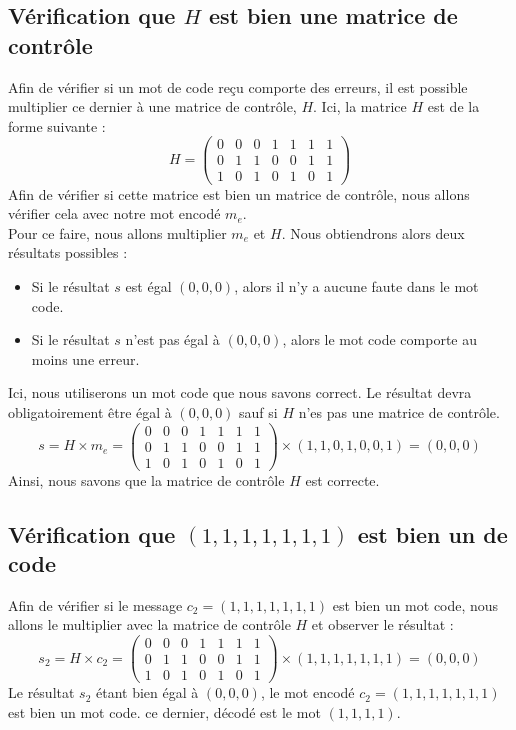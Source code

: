 \subsection{Vérification que $H$ est bien une matrice de contrôle}
Afin de vérifier si un mot de code reçu comporte des erreurs, il est possible multiplier ce dernier à une matrice de contrôle, $H$. Ici, la matrice $H$ est de la forme suivante :
\begin{equation}
 H=
 \begin{pmatrix}
  0 & 0 & 0 & 1 & 1 & 1 & 1 \\
  0 & 1 & 1 & 0 & 0 & 1 & 1 \\
  1 & 0 & 1 & 0 & 1 & 0 & 1
 \end{pmatrix}
\end{equation}
Afin de vérifier si cette matrice est bien un matrice de contrôle, nous allons vérifier cela avec notre mot encodé $m_e$.\\
Pour ce faire, nous allons multiplier $m_e$ et $H$. Nous obtiendrons alors deux résultats possibles :
\begin{itemize}
 \item Si le résultat $s$ est égal $(0,0,0)$, alors il n'y a aucune faute dans le mot code.
 \item Si le résultat $s$ n'est pas égal à $(0,0,0)$, alors le mot code comporte au moins une erreur. 
\end{itemize}
Ici, nous utiliserons un mot code que nous savons correct. Le résultat devra obligatoirement être égal à $(0,0,0)$ sauf si $H$ n'es pas une matrice de contrôle.
\begin{equation}
 s=H\times m_e=
  \begin{pmatrix}
  0 & 0 & 0 & 1 & 1 & 1 & 1 \\
  0 & 1 & 1 & 0 & 0 & 1 & 1 \\
  1 & 0 & 1 & 0 & 1 & 0 & 1
 \end{pmatrix}
 \times(1,1,0,1,0,0,1)=(0,0,0)
\end{equation}
Ainsi, nous savons que la matrice de contrôle $H$ est correcte.
\subsection{Vérification que $(1,1,1,1,1,1,1)$ est bien un de code}
Afin de vérifier si le message $c_2=(1,1,1,1,1,1,1)$ est bien un mot code, nous allons le multiplier avec la matrice de contrôle $H$ et observer le résultat :
\begin{equation}
 s_2=H\times c_2=
  \begin{pmatrix}
  0 & 0 & 0 & 1 & 1 & 1 & 1 \\
  0 & 1 & 1 & 0 & 0 & 1 & 1 \\
  1 & 0 & 1 & 0 & 1 & 0 & 1
 \end{pmatrix}
 \times(1,1,1,1,1,1,1)=(0,0,0)
\end{equation}
Le résultat $s_2$ étant bien égal à $(0,0,0)$, le mot encodé $c_2=(1,1,1,1,1,1,1)$ est bien un mot code. ce dernier, décodé est le mot $(1,1,1,1)$.
